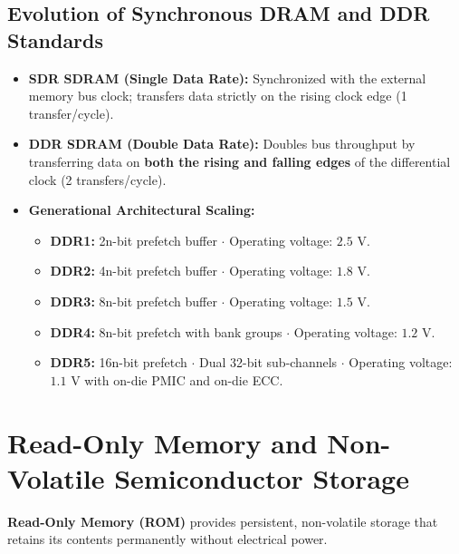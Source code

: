 \subsection{Evolution of Synchronous DRAM and DDR Standards}
\begin{itemize}
    \item \textbf{SDR SDRAM (Single Data Rate):} Synchronized with the external memory bus clock; transfers data strictly on the rising clock edge (1 transfer/cycle).
    \item \textbf{DDR SDRAM (Double Data Rate):} Doubles bus throughput by transferring data on \textbf{both the rising and falling edges} of the differential clock (2 transfers/cycle).
    \item \textbf{Generational Architectural Scaling:}
    \begin{itemize}
        \item \textbf{DDR1:} 2n-bit prefetch buffer $\cdot$ Operating voltage: $2.5\text{ V}$.
        \item \textbf{DDR2:} 4n-bit prefetch buffer $\cdot$ Operating voltage: $1.8\text{ V}$.
        \item \textbf{DDR3:} 8n-bit prefetch buffer $\cdot$ Operating voltage: $1.5\text{ V}$.
        \item \textbf{DDR4:} 8n-bit prefetch with bank groups $\cdot$ Operating voltage: $1.2\text{ V}$.
        \item \textbf{DDR5:} 16n-bit prefetch $\cdot$ Dual 32-bit sub-channels $\cdot$ Operating voltage: $1.1\text{ V}$ with on-die PMIC and on-die ECC.
    \end{itemize}
\end{itemize}


\section{Read-Only Memory and Non-Volatile Semiconductor Storage}
\label{sec:rom_technologies}

\textbf{Read-Only Memory (ROM)} provides persistent, non-volatile storage that retains its contents permanently without electrical power.

